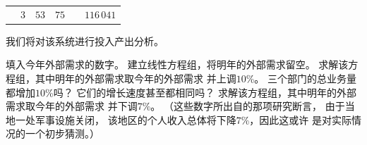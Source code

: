 \begin{exercises}
\begin{center}
\begin{tabular}{r|rrrrr}
              &$3$    &$53$       &$75$       &     &$116\,041$   \\
        \end{tabular}
      \end{center}
      我们将对该系统进行投入产出分析。
      \begin{exparts}
        \partsitem 填入今年外部需求的数字。
        \partsitem 建立线性方程组，将明年的外部需求留空。
        \partsitem 求解该方程组，其中明年的外部需求取今年的外部需求
          并上调$10$\%。
          三个部门的总业务量都增加$10$\%吗？
          它们的增长速度甚至都相同吗？ 
        \partsitem 求解该方程组，其中明年的外部需求取今年的外部需求
          并下调$7$\%。
          （这些数字所出自的那项研究断言，
          由于当地一处军事设施关闭，
          该地区的个人收入总体将下降$7$\%，因此这或许
          是对实际情况的一个初步猜测。）
      \end{exparts}
\end{exercises}
\endinput

